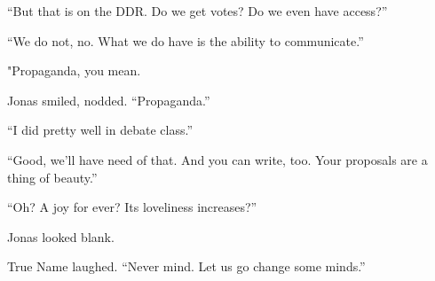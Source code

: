 ``But that is on the DDR. Do we get votes? Do we even have access?''

``We do not, no. What we do have is the ability to communicate.''

"Propaganda, you mean.

Jonas smiled, nodded. ``Propaganda.''

``I did pretty well in debate class.''

``Good, we'll have need of that. And you can write, too. Your proposals are a thing of beauty.''

``Oh? A joy for ever? Its loveliness increases?''

Jonas looked blank.

True Name laughed. ``Never mind. Let us go change some minds.''
